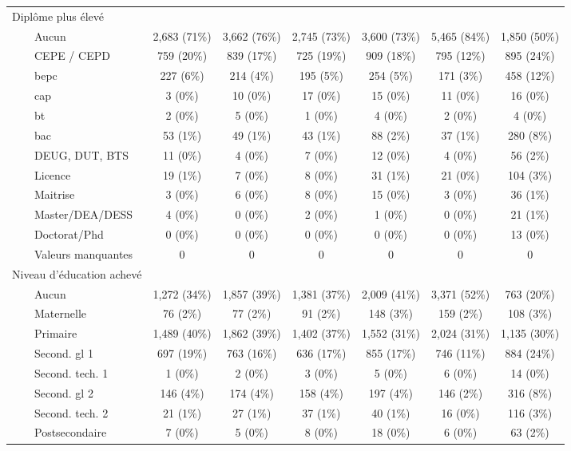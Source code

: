 \documentclass[
]{article}
\begin{document}
\begin{table}[!t]
\begin{tabular*}{\linewidth}{@{\extracolsep{\fill}}lcccccc}
Diplôme plus élevé &  &  &  &  &  &  \\ 
    Aucun & 2,683 (71\%) & 3,662 (76\%) & 2,745 (73\%) & 3,600 (73\%) & 5,465 (84\%) & 1,850 (50\%) \\ 
    CEPE / CEPD & 759 (20\%) & 839 (17\%) & 725 (19\%) & 909 (18\%) & 795 (12\%) & 895 (24\%) \\ 
    bepc & 227 (6\%) & 214 (4\%) & 195 (5\%) & 254 (5\%) & 171 (3\%) & 458 (12\%) \\ 
    cap & 3 (0\%) & 10 (0\%) & 17 (0\%) & 15 (0\%) & 11 (0\%) & 16 (0\%) \\ 
    bt & 2 (0\%) & 5 (0\%) & 1 (0\%) & 4 (0\%) & 2 (0\%) & 4 (0\%) \\ 
    bac & 53 (1\%) & 49 (1\%) & 43 (1\%) & 88 (2\%) & 37 (1\%) & 280 (8\%) \\ 
    DEUG, DUT, BTS & 11 (0\%) & 4 (0\%) & 7 (0\%) & 12 (0\%) & 4 (0\%) & 56 (2\%) \\ 
    Licence & 19 (1\%) & 7 (0\%) & 8 (0\%) & 31 (1\%) & 21 (0\%) & 104 (3\%) \\ 
    Maitrise & 3 (0\%) & 6 (0\%) & 8 (0\%) & 15 (0\%) & 3 (0\%) & 36 (1\%) \\ 
    Master/DEA/DESS & 4 (0\%) & 0 (0\%) & 2 (0\%) & 1 (0\%) & 0 (0\%) & 21 (1\%) \\ 
    Doctorat/Phd & 0 (0\%) & 0 (0\%) & 0 (0\%) & 0 (0\%) & 0 (0\%) & 13 (0\%) \\ 
    Valeurs manquantes & 0 & 0 & 0 & 0 & 0 & 0 \\ 
Niveau d'éducation achevé &  &  &  &  &  &  \\ 
    Aucun & 1,272 (34\%) & 1,857 (39\%) & 1,381 (37\%) & 2,009 (41\%) & 3,371 (52\%) & 763 (20\%) \\ 
    Maternelle & 76 (2\%) & 77 (2\%) & 91 (2\%) & 148 (3\%) & 159 (2\%) & 108 (3\%) \\ 
    Primaire & 1,489 (40\%) & 1,862 (39\%) & 1,402 (37\%) & 1,552 (31\%) & 2,024 (31\%) & 1,135 (30\%) \\ 
    Second. gl 1 & 697 (19\%) & 763 (16\%) & 636 (17\%) & 855 (17\%) & 746 (11\%) & 884 (24\%) \\ 
    Second. tech. 1 & 1 (0\%) & 2 (0\%) & 3 (0\%) & 5 (0\%) & 6 (0\%) & 14 (0\%) \\ 
    Second. gl 2 & 146 (4\%) & 174 (4\%) & 158 (4\%) & 197 (4\%) & 146 (2\%) & 316 (8\%) \\ 
    Second. tech. 2 & 21 (1\%) & 27 (1\%) & 37 (1\%) & 40 (1\%) & 16 (0\%) & 116 (3\%) \\ 
    Postsecondaire & 7 (0\%) & 5 (0\%) & 8 (0\%) & 18 (0\%) & 6 (0\%) & 63 (2\%) \\ 

\end{tabular*}
\end{table}
\end{document}
